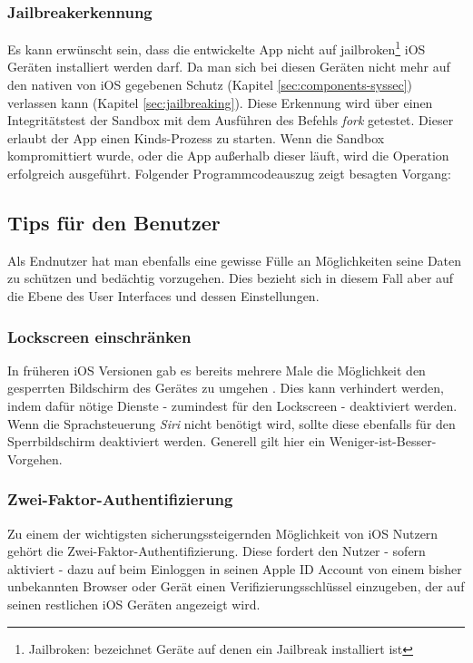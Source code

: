 		\subsubsection{Jailbreakerkennung}
			Es kann erwünscht sein, dass die entwickelte App nicht auf
			jailbroken\footnote{Jailbroken: bezeichnet Geräte auf denen ein Jailbreak
			installiert ist} iOS Geräten installiert werden darf.
			Da man sich bei diesen Geräten nicht mehr auf den nativen von iOS gegebenen Schutz (Kapitel
			\ref{sec:components-syssec}) verlassen kann (Kapitel \ref{sec:jailbreaking}).
			Diese Erkennung wird über einen Integritätstest der Sandbox mit dem
			Ausführen des Befehls \textsl{fork} getestet\cite[S.328]{Zdziarski2012}.
			Dieser erlaubt der App einen Kinds-Prozess zu starten. Wenn die Sandbox
			kompromittiert wurde, oder die App außerhalb dieser läuft, wird die
			Operation erfolgreich ausgeführt. Folgender Programmcodeauszug zeigt
			besagten Vorgang:
			
	\subsection{Tips für den Benutzer}
		Als Endnutzer hat man ebenfalls eine gewisse Fülle an Möglichkeiten seine
		Daten zu schützen und bedächtig vorzugehen. Dies bezieht sich in diesem Fall
		aber auf die Ebene des User Interfaces und dessen Einstellungen.
		\subsubsection{Lockscreen einschränken}
			In früheren iOS Versionen gab es bereits mehrere Male die Möglichkeit den
			gesperrten Bildschirm des Gerätes zu umgehen
			\cite{IOS7LockscreenBypass2013}.
			Dies kann verhindert werden, indem dafür nötige Dienste - zumindest für den
			Lockscreen - deaktiviert werden. Wenn die Sprachsteuerung \textsl{Siri} nicht benötigt
			wird, sollte diese ebenfalls für den Sperrbildschirm deaktiviert werden.
			Generell gilt hier ein Weniger-ist-Besser-Vorgehen.
		\subsubsection{Zwei-Faktor-Authentifizierung }
			Zu einem der wichtigsten sicherungssteigernden Möglichkeit von iOS Nutzern
			gehört die Zwei-Faktor-Authentifizierung. Diese fordert den Nutzer - sofern
			aktiviert - dazu auf beim Einloggen in seinen Apple ID Account von einem
			bisher unbekannten Browser oder Gerät einen Verifizierungsschlüssel
			einzugeben, der auf seinen restlichen iOS Geräten angezeigt
			wird\cite{AppleiOS9Preview2015}.
